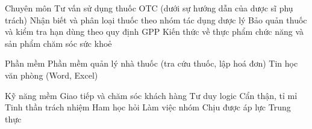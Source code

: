 \begin{cvskills}

  \cvskill
    {Chuyên môn}
    {Tư vấn sử dụng thuốc OTC (dưới sự hướng dẫn của dược sĩ phụ trách) \textperiodcentered{} Nhận biết và phân loại thuốc theo nhóm tác dụng dược lý \textperiodcentered{} Bảo quản thuốc và kiểm tra hạn dùng theo quy định GPP \textperiodcentered{} Kiến thức về thực phẩm chức năng và sản phẩm chăm sóc sức khoẻ}

  \cvskill
    {Phần mềm}
    {Phần mềm quản lý nhà thuốc (tra cứu thuốc, lập hoá đơn) \textperiodcentered{} Tin học văn phòng (Word, Excel)}

  \cvskill
    {Kỹ năng mềm}
    {Giao tiếp và chăm sóc khách hàng \textperiodcentered{} Tư duy logic \textperiodcentered{} Cẩn thận, tỉ mỉ \textperiodcentered{} Tinh thần trách nhiệm \textperiodcentered{} Ham học hỏi \textperiodcentered{} Làm việc nhóm \textperiodcentered{} Chịu được áp lực \textperiodcentered{} Trung thực}

\end{cvskills}
